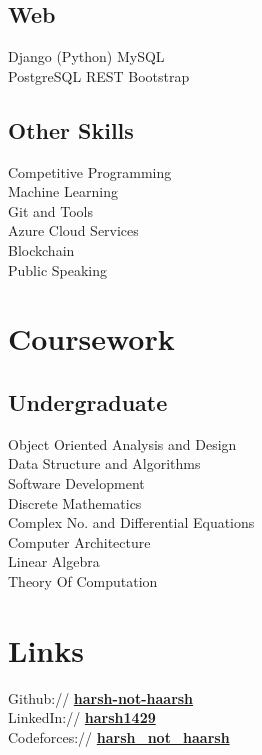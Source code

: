 \documentclass[]{deedy-resume-openfont}
\begin{document}
\begin{minipage}[t]{0.33\textwidth}
\subsection{Web}
\textbullet{} Django (Python) \textbullet{} MySQL \\\textbullet{} PostgreSQL \textbullet{} REST \textbullet{} Bootstrap
\sectionsep
\subsection{Other Skills}
\textbullet{}Competitive Programming\\\textbullet{}Machine Learning\\ \textbullet{}Git and Tools\\\textbullet{}Azure Cloud Services\\\textbullet{}Blockchain\\\textbullet{}Public Speaking
\sectionsep

\section{Coursework}

\subsection{Undergraduate}
Object Oriented Analysis and Design \\
Data Structure and Algorithms \\
Software Development \\
Discrete Mathematics \\
Complex No. and Differential Equations \\
Computer Architecture \\
Linear Algebra\\
Theory Of Computation


\sectionsep


\section{Links} 
Github:// \href{https://github.com/harsh-not-haarsh}{\bf harsh-not-haarsh \faExternalLink} \\
LinkedIn://  \href{https://www.linkedin.com/in/harsh1429}{\bf harsh1429 \faExternalLink} \\
Codeforces:// \href{http://codeforces.com/profile/harsh_not_haarsh}{\bf harsh\_not\_haarsh \faExternalLink}
\sectionsep


\end{minipage}
\end{document}
